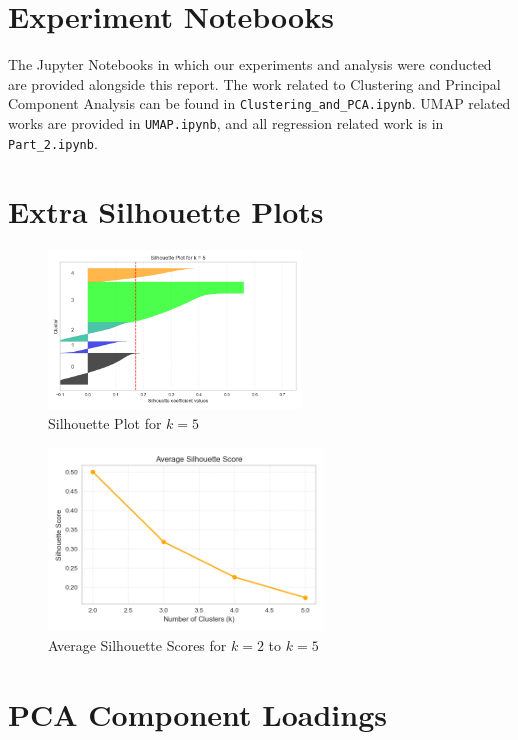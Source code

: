 \documentclass{article}
\begin{document}
\section{Experiment Notebooks}
The Jupyter Notebooks in which our experiments and analysis were conducted are provided alongside this report. The work related to Clustering and Principal Component Analysis can be found in \texttt{Clustering\_and\_PCA.ipynb}. UMAP related works are provided in \texttt{UMAP.ipynb}, and all regression related work is in \texttt{Part\_2.ipynb}.

\section{Extra Silhouette Plots}

\begin{figure}[H]
    \centering
    \includegraphics[width=0.6\textwidth]{figures/silhouette_k5.png}
    \caption{Silhouette Plot for $k=5$}
    \label{fig:silhouette_k5}
\end{figure}

\begin{figure}[H]
    \centering
    \includegraphics[width=0.65\textwidth]{figures/silhouette_scores.png}
    \caption{Average Silhouette Scores for $k=2$ to $k=5$}
    \label{fig:silhouette_scores}
\end{figure}


\section{PCA Component Loadings}
\end{document}
